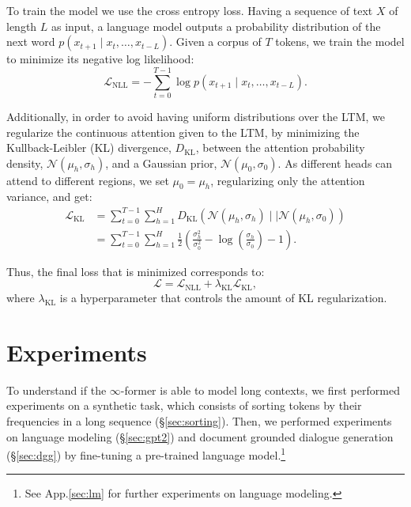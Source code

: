 \documentclass[11pt]{article}
\begin{document}
To train the model we use the cross entropy loss. Having a sequence of text $X$ of length $L$ as input, a language model outputs a probability distribution of the next word ${p( x_{t+1}\mid x_{t},\dots,x_{t-L})}$. Given a corpus of $T$ tokens, we train the model to minimize its negative log likelihood:
\begin{equation}
    \mathcal{L}_{\mathrm{NLL}} = -\sum_{t=0}^{T-1} \log p( x_{t+1}\mid x_{t},\dots,x_{t-L}).
\end{equation}

Additionally, in order to avoid having uniform distributions over the LTM, we regularize the continuous attention given to the LTM, by minimizing the Kullback-Leibler (KL) divergence, $D_{\mathrm{KL}}$, between the attention probability density, ${\mathcal{N}(\mu_{h},\sigma_{h})}$, and a Gaussian prior, ${\mathcal{N}(\mu_0,\sigma_0)}$. As different heads can attend to different regions, we set $\mu_0=\mu_h$, regularizing only the attention variance, and get:
\begin{align}
    \!\!\mathcal{L}_\mathrm{KL} \!&=\! \sum_{t=0}^{T-1} \sum_{h=1}^{H} D_\mathrm{KL}\left( \mathcal{N}(\mu_{h},\sigma_{h})\mid \mid \mathcal{N}(\mu_h,\sigma_0) \right)\\
    &=\! \sum_{t=0}^{T-1} \sum_{h=1}^{H} \frac{1}{2} \!\left(\frac{\sigma_h^2}{\sigma_0^2} - \log \! \left(\frac{\sigma_h}{\sigma_0}\right)-1\right).
\end{align}

Thus, the final loss that is minimized corresponds to:
\begin{equation}
    \mathcal{L} = \mathcal{L}_{\mathrm{NLL}} + \lambda_{\mathrm{KL}} \mathcal{L}_\mathrm{KL},
\end{equation}
where $\lambda_{\mathrm{KL}}$ is a hyperparameter that controls the amount of KL regularization.

\section{Experiments}
\label{sec:experiments}
To understand if the $\infty$-former is able to model long contexts, we first performed experiments on a synthetic task, which consists of sorting tokens by their frequencies in a long sequence (\S \ref{sec:sorting}). 
Then, we performed experiments on language modeling  (\S \ref{sec:gpt2}) and document grounded dialogue generation (\S \ref{sec:dgg}) by fine-tuning a pre-trained language model.\footnote{See App.\ref{sec:lm} for further experiments on language modeling.}
\end{document}
